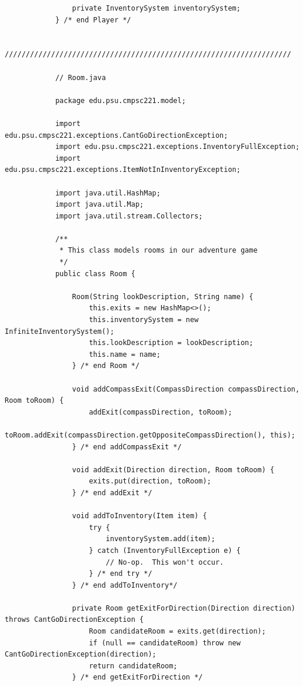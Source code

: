 \documentclass[a4paper, 11pt]{article}
\begin{document}
\begin{lstlisting}
                private InventorySystem inventorySystem;
            } /* end Player */

            ////////////////////////////////////////////////////////////////////

            // Room.java

            package edu.psu.cmpsc221.model;

            import edu.psu.cmpsc221.exceptions.CantGoDirectionException;
            import edu.psu.cmpsc221.exceptions.InventoryFullException;
            import edu.psu.cmpsc221.exceptions.ItemNotInInventoryException;

            import java.util.HashMap;
            import java.util.Map;
            import java.util.stream.Collectors;

            /**
             * This class models rooms in our adventure game
             */
            public class Room {

                Room(String lookDescription, String name) {
                    this.exits = new HashMap<>();
                    this.inventorySystem = new InfiniteInventorySystem();
                    this.lookDescription = lookDescription;
                    this.name = name;
                } /* end Room */

                void addCompassExit(CompassDirection compassDirection, Room toRoom) {
                    addExit(compassDirection, toRoom);
                    toRoom.addExit(compassDirection.getOppositeCompassDirection(), this);
                } /* end addCompassExit */

                void addExit(Direction direction, Room toRoom) {
                    exits.put(direction, toRoom);
                } /* end addExit */

                void addToInventory(Item item) {
                    try {
                        inventorySystem.add(item);
                    } catch (InventoryFullException e) {
                        // No-op.  This won't occur.
                    } /* end try */
                } /* end addToInventory*/

                private Room getExitForDirection(Direction direction) throws CantGoDirectionException {
                    Room candidateRoom = exits.get(direction);
                    if (null == candidateRoom) throw new CantGoDirectionException(direction);
                    return candidateRoom;
                } /* end getExitForDirection */


\end{lstlisting}
\end{document}
